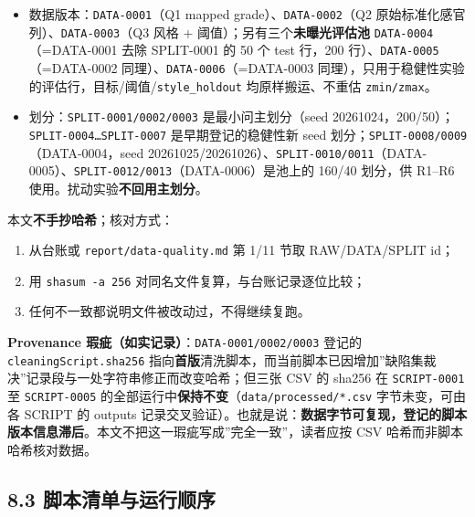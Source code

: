 \documentclass[
  11pt,
]{ctexart}
\providecommand{\tightlist}{%
  \setlength{\itemsep}{0pt}\setlength{\parskip}{0pt}}
\begin{document}
\begin{itemize}
\tightlist
\item
  数据版本：\texttt{DATA-0001}（Q1 mapped
  grade）、\texttt{DATA-0002}（Q2
  原始标准化感官列）、\texttt{DATA-0003}（Q3 风格 +
  阈值）；另有三个\textbf{未曝光评估池} \texttt{DATA-0004}（=DATA-0001
  去除 SPLIT-0001 的 50 个 test 行，200
  行）、\texttt{DATA-0005}（=DATA-0002
  同理）、\texttt{DATA-0006}（=DATA-0003
  同理），只用于稳健性实验的评估行，目标/阈值/\texttt{style\_\allowbreak{}holdout}
  均原样搬运、不重估 \texttt{zmin/zmax}。
\item
  划分：\texttt{SPLIT-0001/\allowbreak{}0002/\allowbreak{}0003} 是最小问主划分（seed
  20261024，200/50）；\texttt{SPLIT-0004…SPLIT-0007}
  是早期登记的稳健性新 seed
  划分；\texttt{SPLIT-0008/\allowbreak{}0009}（DATA-0004，seed
  20261025/20261026）、\texttt{SPLIT-0010/\allowbreak{}0011}（DATA-0005）、\texttt{SPLIT-0012/\allowbreak{}0013}（DATA-0006）是池上的
  160/40 划分，供 R1--R6 使用。扰动实验\textbf{不回用主划分}。
\end{itemize}

本文\textbf{不手抄哈希}；核对方式：

\begin{enumerate}
\def\labelenumi{\arabic{enumi}.}
\tightlist
\item
  从台账或 \texttt{report/\allowbreak{}data-quality.\allowbreak{}md} 第 1/11 节取 RAW/DATA/SPLIT
  id；
\item
  用 \texttt{shasum\ -a\ 256} 对同名文件复算，与台账记录逐位比较；
\item
  任何不一致都说明文件被改动过，不得继续复跑。
\end{enumerate}

\textbf{Provenance 瑕疵（如实记录）}：\texttt{DATA-0001/\allowbreak{}0002/\allowbreak{}0003}
登记的 \texttt{cleaningScript.\allowbreak{}sha256}
指向\textbf{首版}清洗脚本，而当前脚本已因增加''缺陷集裁决''记录段与一处字符串修正而改变哈希；但三张
CSV 的 sha256 在 \texttt{SCRIPT-0001} 至 \texttt{SCRIPT-0005}
的全部运行中\textbf{保持不变}（\texttt{data/\allowbreak{}processed/\allowbreak{}*.\allowbreak{}csv}
字节未变，可由各 SCRIPT 的 outputs
记录交叉验证）。也就是说：\textbf{数据字节可复现，登记的脚本版本信息滞后}。本文不把这一瑕疵写成''完全一致''，读者应按
CSV 哈希而非脚本哈希核对数据。

\subsection{8.3
脚本清单与运行顺序}\label{ux811aux672cux6e05ux5355ux4e0eux8fd0ux884cux987aux5e8f}
\end{document}
